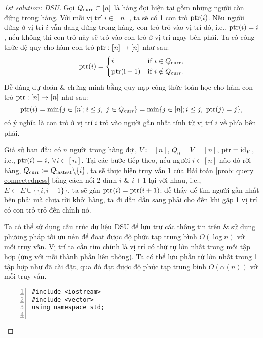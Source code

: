 \documentclass{article}
\begin{document}
\begin{proof}[1st solution: DSU]
    Gọi $Q_{\rm curr}\subset[n]$ là hàng đợi hiện tại gồm những người còn đứng trong hàng. Với mỗi vị trí $i\in[n]$, ta sẽ có 1 con trỏ ${\rm ptr}(i)$. Nếu người đứng ở vị trí $i$ vẫn đang đứng trong hàng, con trỏ trỏ vào vị trí đó, i.e., ${\rm ptr}(i) = i$, nếu không thì con trỏ này sẽ trỏ vào con trỏ ở vị trí ngay bên phải. Ta có công thức đệ quy cho hàm con trỏ ${\rm ptr}:[n]\to[n]$ như sau:
    \begin{equation*}
        {\rm ptr}(i) = \left\{\begin{split}
            &i&&\mbox{if } i\in Q_{\rm curr},\\
            &{\rm ptr(i + 1)}&&\mbox{if } i\notin Q_{\rm curr}.
        \end{split}\right.
    \end{equation*}
    Dễ dàng dự đoán \& chứng minh bằng quy nạp công thức toán học cho hàm con trỏ ${\rm ptr}:[n]\to[n]$ như sau:
    \begin{equation*}
        {\rm ptr}(i) = \min\{j\in[n];i\le j,\ j\in Q_{\rm curr}\} = \min\{j\in[n];i\le j,\ {\rm ptr}(j) = j\},
    \end{equation*}
    có ý nghĩa là con trỏ ở vị trí $i$ trỏ vào người gần nhất tính từ vị trí $i$ về phía bên phải.

    Giả sử ban đầu có $n$ người trong hàng đợi, $V\coloneqq [n]$, $Q_0 = V = [n]$, ${\rm ptr} = {\rm id}_V$, i.e., ${\rm ptr}(i) = i$, $\forall i\in[n]$. Tại các bước tiếp theo, nếu người $i\in[n]$ nào đó rời hàng, $Q_{\rm curr}\coloneqq Q_{\rm lastest}\backslash\{i\}$, ta sẽ thực hiện truy vấn 1 của Bài toán \ref{prob: query connectedness} bằng cách nối 2 đỉnh $i$ \& $i + 1$ lại với nhau, i.e., $E\leftarrow E\cup\{\{i,i + 1\}\}$, ta sẽ gán ${\rm ptr}(i) = {\rm ptr}(i + 1)$: dễ thấy để tìm người gần nhất bên phải mà chưa rời khỏi hàng, ta đi dần dần sang phải cho đến khi gặp 1 vị trí có con trỏ trỏ đến chính nó.

    Ta có thể sử dụng cấu trúc dữ liệu DSU để lưu trữ các thông tin trên \& sử dụng phương pháp tối ưu nén để đoạt được độ phức tạp trung bình $O(\log n)$ với mỗi truy vấn. Vị trí ta cần tìm chính là vị trí có thứ tự lớn nhất trong mỗi tập hợp (ứng với mỗi thành phần liên thông). Ta có thể lưu phần tử lớn nhất trong 1 tập hợp như đã cài đặt, qua đó đạt được độ phức tạp trung bình $O(\alpha(n))$ với mỗi truy vấn.
    \begin{Verbatim}[numbers=left,xleftmargin=5mm]
#include <iostream>
#include <vector>
using namespace std;


\end{Verbatim}
\end{proof}
\end{document}
